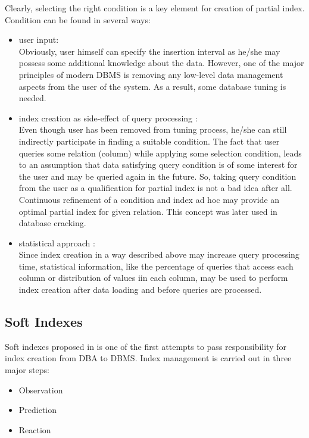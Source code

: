 \documentclass[10pt, conference, compsocconf]{IEEEtran}
\begin{document}
Clearly, selecting the right condition is a key element for creation of partial index. Condition can be found in several ways:\\
\begin{itemize}

\item{user input}: \\

Obviously, user himself can specify the insertion interval as he/she may possess some additional knowledge about the data. However, one of the major principles of modern DBMS is removing any low-level data management aspects from the user of the system. As a result, some database tuning is needed.\\

\item{index creation as side-effect of query processing \cite{partial1}}: \\

Even though user has been removed from tuning process, he/she can still indirectly participate in finding a suitable condition. The fact that user queries some relation (column) while applying some selection condition, leads to an assumption that data satisfying query condition is of some interest for the user and may be queried again in the future. So, taking query condition from the user as a qualification for partial index is not a bad idea after all. Continuous refinement of a condition and index ad hoc may provide an optimal partial index for given relation. This concept was later used in database cracking.\\

\item{statistical approach \cite{partial2}}: \\

Since index creation in a way described above may increase query processing time, statistical information, like the percentage of queries that access each column or distribution of values iin each column, may be used to perform index creation after data loading and before queries are processed.
\end{itemize}

\subsection{Soft Indexes}
Soft indexes proposed in \cite{soft_indexes} is one of the first attempts to pass responsibility for index creation from DBA to DBMS. Index management is carried out in three major steps:
\begin{itemize}
\item{Observation}
\item{Prediction}
\item{Reaction}
\end{itemize}
\end{document}

